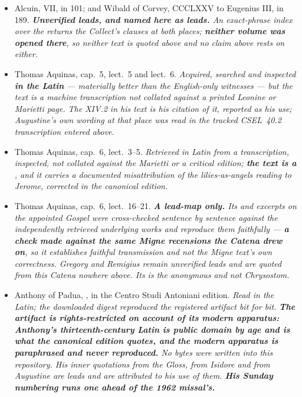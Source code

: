 \begin{itemize}[leftmargin=1.2em, itemsep=0.15em]
{are reported there in this guide's own words. The Collect gloss at col.~580B,
the Offertory's angel at cols.~580A--B and the Gradual's princes at
cols.~579D--580A stand outside the flagged column and are quoted. \textbf{His Fourteenth Sunday is not the
1962 Fourteenth Sunday} --- his Gospel is the ten lepers, and the 1962 Gospel
is his Fifteenth --- and that bound travels with every use of him above.}
\item Alcuin,  VII, in  101;
and Wibald of Corvey,  CCCLXXV to Eugenius III, in
 189. \textit{\textbf{Unverified leads, and named here
as leads.} An exact-phrase index over the  returns the
Collect's clauses at both places; \textbf{neither volume was opened there}, so
neither text is quoted above and no claim above rests on either.}
\item Thomas Aquinas,  cap.~5,
lect.~5 and lect.~6. \textit{Acquired, searched and inspected \textbf{in the
Latin} --- materially better than the English-only witnesses --- but the text
is a machine transcription not collated against a printed Leonine or Marietti
page. The  XIV.2 in his text is his citation of it,
reported as his use; Augustine's own wording at that place was read in the
tracked CSEL~40.2 transcription entered above.}
\item Thomas Aquinas,  cap.~6, lect.~3--5.
\textit{Retrieved in Latin from a transcription, inspected, not collated
against the Marietti or a critical edition; \textbf{the text is a
}, and it carries a documented misattribution of the
lilies-as-angels reading to Jerome, corrected in the canonical edition.}
\item Thomas Aquinas,  cap.~6, lect.~16--21.
\textit{\textbf{A lead-map only.} Its  and 
excerpts on the appointed Gospel were cross-checked sentence by sentence
against the independently retrieved underlying works and reproduce them
faithfully --- \textbf{a check made against the same Migne recensions the
Catena drew on}, so it establishes faithful transmission and not the Migne
text's own correctness. Gregory and Remigius remain unverified leads and are
quoted from this Catena nowhere above. Its  is
the anonymous  and not Chrysostom.}
\item Anthony of Padua, , in the
Centro Studi Antoniani edition. \textit{Read in the Latin; the downloaded
digest reproduced the registered artifact bit for bit. \textbf{The artifact is
rights-restricted on account of its modern apparatus: Anthony's
thirteenth-century Latin is public domain by age and is what the canonical
edition quotes, and the modern apparatus is paraphrased and never reproduced.} No bytes were
written into this repository. His inner quotations from the Gloss, from Isidore
and from Augustine are leads and are attributed to his use of them.
\textbf{His Sunday numbering runs one ahead of the 1962 missal's.}}
\end{itemize}

